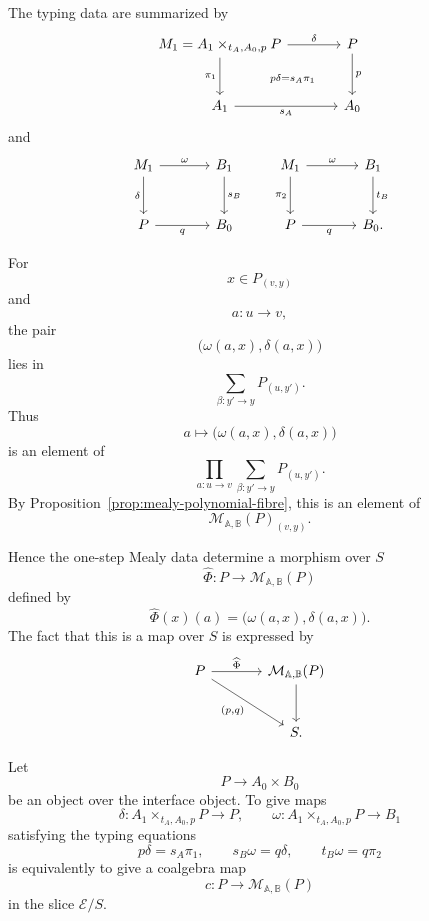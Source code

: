The typing data are summarized by
\[
\begin{tikzcd}[column sep=large,row sep=large]
M_1=A_1\times_{t_A,A_0,p}P
  \arrow[r, "\delta"]
  \arrow[d, "\pi_1"']
  \arrow[dr, phantom, "\scriptstyle p\delta=s_A\pi_1"]
&
P
  \arrow[d, "p"]
\\
A_1
  \arrow[r, "s_A"']
&
A_0
\end{tikzcd}
\]
and
\[
\begin{tikzcd}[column sep=large,row sep=large]
M_1
  \arrow[r, "\omega"]
  \arrow[d, "\delta"']
&
B_1
  \arrow[d, "s_B"]
\\
P
  \arrow[r, "q"']
&
B_0
\end{tikzcd}
\qquad
\begin{tikzcd}[column sep=large,row sep=large]
M_1
  \arrow[r, "\omega"]
  \arrow[d, "\pi_2"']
&
B_1
  \arrow[d, "t_B"]
\\
P
  \arrow[r, "q"']
&
B_0 .
\end{tikzcd}
\]

For
\[
x\in P_{(v,y)}
\]
and
\[
a:u\to v,
\]
the pair
\[
\bigl(\omega(a,x),\delta(a,x)\bigr)
\]
lies in
\[
\sum_{\beta:y'\to y}P_{(u,y')}.
\]
Thus
\[
a
\longmapsto
\bigl(\omega(a,x),\delta(a,x)\bigr)
\]
is an element of
\[
\prod_{a:u\to v}
\sum_{\beta:y'\to y}
P_{(u,y')}.
\]
By Proposition~\ref{prop:mealy-polynomial-fibre}, this is an element of
\[
\mathcal M_{\mathbb A,\mathbb B}(P)_{(v,y)}.
\]

Hence the one-step Mealy data determine a morphism over \(S\)
\[
\widehat{\Phi}:P\to\mathcal M_{\mathbb A,\mathbb B}(P)
\]
defined by
\[
\widehat{\Phi}(x)(a)
=
\bigl(\omega(a,x),\delta(a,x)\bigr).
\]
The fact that this is a map over \(S\) is expressed by
\[
\begin{tikzcd}[column sep=large,row sep=large]
P
  \arrow[r, "\widehat{\Phi}"]
  \arrow[dr, "{(p,q)}"']
&
\mathcal M_{\mathbb A,\mathbb B}(P)
  \arrow[d]
\\
&
S .
\end{tikzcd}
\]

\begin{theorem}
\label{thm:polynomial-currying-one-step}
Let
\[
P\to A_0\times B_0
\]
be an object over the interface object. To give maps
\[
\delta:
A_1\times_{t_A,A_0,p}P\to P,
\qquad
\omega:
A_1\times_{t_A,A_0,p}P\to B_1
\]
satisfying the typing equations
\[
p\delta=s_A\pi_1,
\qquad
s_B\omega=q\delta,
\qquad
t_B\omega=q\pi_2
\]
is equivalently to give a coalgebra map
\[
c:P\to\mathcal M_{\mathbb A,\mathbb B}(P)
\]
in the slice \(\mathcal E/S\).
\end{theorem}

